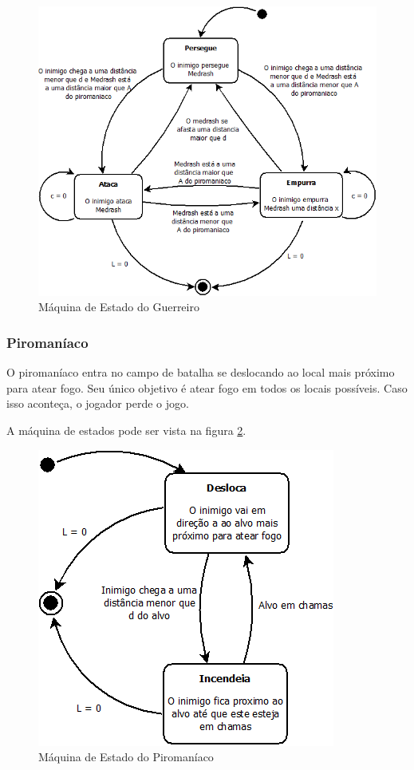 \begin{figure}[!ht]
 \centering
 \includegraphics[scale=0.5]{ia_guerreiro.png}
 \caption{Máquina de Estado do Guerreiro}
 \label{fsm:guerreiro}
\end{figure}

\subsubsection{Piromaníaco}

O piromaníaco entra no campo de batalha se deslocando ao local mais
próximo para atear fogo. Seu único objetivo é atear fogo em todos os
locais possíveis. Caso isso aconteça, o jogador perde o jogo.

A máquina de estados pode ser vista na figura \ref{fsm:piromaniaco}.

\begin{figure}[!ht]
 \centering
 \includegraphics[scale=0.5]{ia_piromaniaco.png}
 \caption{Máquina de Estado do Piromaníaco}
 \label{fsm:piromaniaco}
\end{figure}

